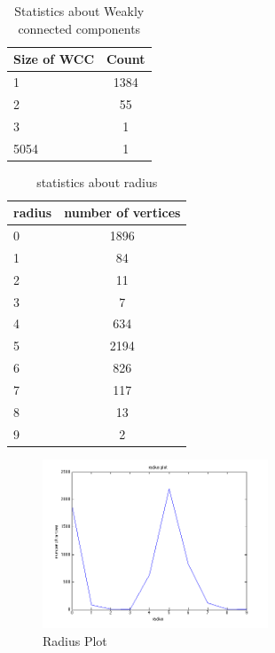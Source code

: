 \begin{table}
\begin{center}
\begin{tabular}{| l | c |}
  \hline                        
  Size of WCC & Count  \\ \hline
  1 & 1384  \\ \hline
  2 & 55  \\ \hline
  3 & 1 \\ \hline
  5054 & 1 \\ \hline  
\end{tabular}
\caption{Statistics about Weakly connected components}
\label{table:wcc}
\end{center}
\end{table}

\begin{table}
\begin{center}
\begin{tabular}{| l | c |}
  \hline                        
  radius & number of vertices  \\ \hline
  0 & 1896  \\ \hline
  1 & 84  \\ \hline
  2 & 11 \\ \hline
  3 & 7 \\ \hline  
  4 & 634 \\ \hline  
  5 & 2194 \\ \hline  
  6 & 826 \\ \hline  
  7 & 117 \\ \hline  
  8 & 13 \\ \hline
  9 & 2 \\ \hline   
\end{tabular}
\caption{statistics about radius}
\label{table:radius}
\end{center} 
\end{table}

\begin{figure}[htbf]
\begin{center}
     \includegraphics[width=0.6\textwidth]{FIG/radius.png}
\caption{Radius Plot}
\label{fig:radius}
\end{center}
\end{figure}


